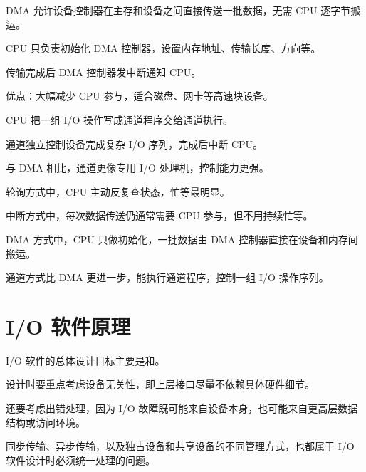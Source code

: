 \begin{points}
  \item DMA 允许设备控制器在主存和设备之间直接传送一批数据，无需 CPU 逐字节搬运。
  \item CPU 只负责初始化 DMA 控制器，设置内存地址、传输长度、方向等。
  \item 传输完成后 DMA 控制器发中断通知 CPU。
  \item 优点：大幅减少 CPU 参与，适合磁盘、网卡等高速块设备。
\end{points}


\begin{points}
  \item CPU 把一组 I/O 操作写成通道程序交给通道执行。
  \item 通道独立控制设备完成复杂 I/O 序列，完成后中断 CPU。
  \item 与 DMA 相比，通道更像专用 I/O 处理机，控制能力更强。
\end{points}


\begin{points}
  \item 轮询方式中，CPU 主动反复查状态，忙等最明显。
  \item 中断方式中，每次数据传送仍通常需要 CPU 参与，但不用持续忙等。
  \item DMA 方式中，CPU 只做初始化，一批数据由 DMA 控制器直接在设备和内存间搬运。
  \item 通道方式比 DMA 更进一步，能执行通道程序，控制一组 I/O 操作序列。
\end{points}


\section{I/O 软件原理}
\begin{points}
  \item I/O 软件的总体设计目标主要是和。
  \item 设计时要重点考虑设备无关性，即上层接口尽量不依赖具体硬件细节。
  \item 还要考虑出错处理，因为 I/O 故障既可能来自设备本身，也可能来自更高层数据结构或访问环境。
  \item 同步传输、异步传输，以及独占设备和共享设备的不同管理方式，也都属于 I/O 软件设计时必须统一处理的问题。
\end{points}

